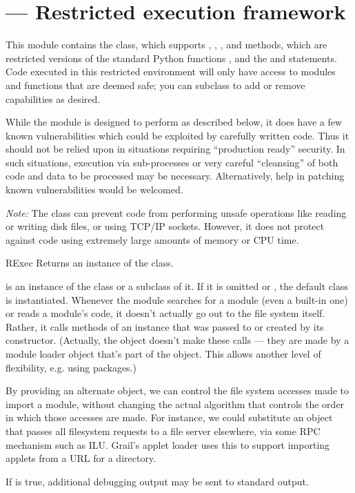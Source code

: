 \section{ ---
         Restricted execution framework}



This module contains the  class, which supports
, , , and
 methods, which are restricted versions of the standard
Python functions ,  and
the  and  statements.
Code executed in this restricted environment will
only have access to modules and functions that are deemed safe; you
can subclass  to add or remove capabilities as desired.

While the  module is designed to perform as described
below, it does have a few known vulnerabilities which could be
exploited by carefully written code.  Thus it should not be relied
upon in situations requiring ``production ready'' security.  In such
situations, execution via sub-processes or very careful ``cleansing''
of both code and data to be processed may be necessary.
Alternatively, help in patching known  vulnerabilities
would be welcomed.

\emph{Note:} The  class can prevent code from performing
unsafe operations like reading or writing disk files, or using TCP/IP
sockets.  However, it does not protect against code using extremely
large amounts of memory or CPU time.  

\begin{classdesc}{RExec}{}
Returns an instance of the  class.  

 is an instance of the  class or a subclass of it.
If it is omitted or , the default  class is
instantiated.
Whenever the  module searches for a module (even a
built-in one) or reads a module's code, it doesn't actually go out to
the file system itself.  Rather, it calls methods of an 
instance that was passed to or created by its constructor.  (Actually,
the  object doesn't make these calls --- they are made by
a module loader object that's part of the  object.  This
allows another level of flexibility, e.g. using packages.)

By providing an alternate  object, we can control the
file system accesses made to import a module, without changing the
actual algorithm that controls the order in which those accesses are
made.  For instance, we could substitute an  object that
passes all filesystem requests to a file server elsewhere, via some
RPC mechanism such as ILU.  Grail's applet loader uses this to support
importing applets from a URL for a directory.

If  is true, additional debugging output may be sent to
standard output.
\end{classdesc}

